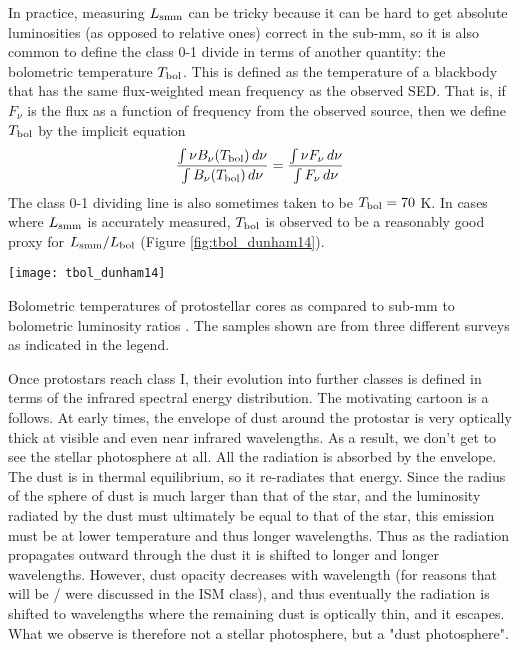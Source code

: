 In practice, measuring $L_{\rm smm}$ can be tricky because it can be hard to get absolute luminosities (as opposed to relative ones) correct in the sub-mm, so it is also common to define the class 0-1 divide in terms of another quantity: the bolometric temperature $T_{\rm bol}$. This is defined as the temperature of a blackbody that has the same flux-weighted mean frequency as the observed SED. That is, if $F_\nu$ is the flux as a function of frequency from the observed source, then we define $T_{\rm bol}$ by the implicit equation
\begin{equation}
\frac{\int \nu B_{\nu}(T_{\rm bol}) \, d\nu}{\int B_{\nu}(T_{\rm bol}) \, d\nu} = \frac{\int \nu F_{\nu}\, d\nu}{\int F_\nu \,d\nu}
\end{equation}
The class 0-1 dividing line is also sometimes taken to be $T_{\rm bol} = 70$ K. In cases where $L_{\rm smm}$ is accurately measured, $T_{\rm bol}$ is observed to be a reasonably good proxy for $L_{\rm smm} / L_{\rm bol}$ (Figure \ref{fig:tbol_dunham14}).

\begin{marginfigure}
\texttt{[image: tbol\_dunham14]}
\caption[Bolometric temperatures of protostellar cores]{
\label{fig:tbol_dunham14}
Bolometric temperatures of protostellar cores as compared to sub-mm to bolometric luminosity ratios \citep{dunham14a}. The samples shown are from three different surveys as indicated in the legend.
}
\end{marginfigure}

Once protostars reach class I, their evolution into further classes is defined in terms of the infrared spectral energy distribution. The motivating cartoon is a follows. At early times, the envelope of dust around the protostar is very optically thick at visible and even near infrared wavelengths. As a result, we don't get to see the stellar photosphere at all. All the radiation is absorbed by the envelope. The dust is in thermal equilibrium, so it re-radiates that energy. Since the radius of the sphere of dust is much larger than that of the star, and the luminosity radiated by the dust must ultimately be equal to that of the star, this emission must be at lower temperature and thus longer wavelengths. Thus as the radiation propagates outward through the dust it is shifted to longer and longer wavelengths. However, dust opacity decreases with wavelength (for reasons that will be / were discussed in the ISM class), and thus eventually the radiation is shifted to wavelengths where the remaining dust is optically thin, and it escapes. What we observe is therefore not a stellar photosphere, but a "dust photosphere".

